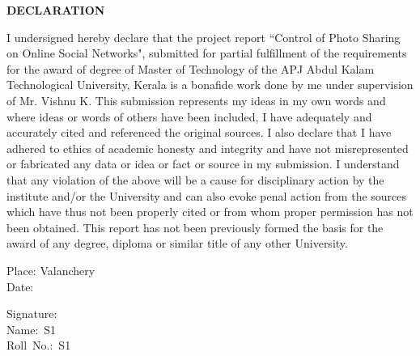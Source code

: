 \newpage

\thispagestyle{empty}

\begin{center}
	\vspace*{1cm}
	\large \textbf{DECLARATION}
\end{center}

\vspace*{1cm}
\begin{doublespace}
I undersigned hereby declare that the project report ``Control of Photo Sharing on Online Social Networks", submitted for partial fulfillment of the requirements for the award of degree of Master of Technology of the APJ Abdul Kalam Technological University, Kerala is a bonafide work done by me under supervision of Mr. Vishnu K. This submission represents my ideas in my own words and where ideas or words of others have been included, I have adequately and accurately cited and referenced the original sources. I also declare that I have adhered to ethics of academic honesty and integrity and have not misrepresented or fabricated any data or idea or fact or source in my submission. I understand that any violation of the above will be a cause for disciplinary action by the institute and/or the University and can also evoke penal action from the sources which have thus not been properly cited or from whom proper permission has not been obtained. This report has not been previously formed the basis for the award of any degree, diploma or similar title of any other University.
\end{doublespace}

\vspace{1cm}
\noindent
\begin{minipage}[t]{0.6\linewidth}
	\begin{flushleft}
		\begin{singlespace}
			Place: Valanchery \\
			Date: \\
		\end{singlespace}
	\end{flushleft}
\end{minipage}
\hfill
\noindent
\begin{minipage}[t]{0.6\linewidth}
	\begin{flushleft}
		\begin{singlespace}
			Signature\hspace{.2cm}:\\
			Name\hspace{0.9cm}:~S1 \\
			Roll~No.\hspace{0.4cm}:~S1
		\end{singlespace}
	\end{flushleft}
\end{minipage}
